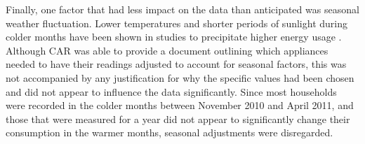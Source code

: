 Finally, one factor that had less impact on the data than anticipated was seasonal weather fluctuation. Lower temperatures and shorter periods of sunlight during colder months have been shown in studies to precipitate higher energy usage \cite{DECC}. Although CAR was able to provide a document outlining which appliances needed to have their readings adjusted to account for seasonal factors, this was not accompanied by any justification for why the specific values had been chosen and did not appear to influence the data significantly. Since most households were recorded in the colder months between November 2010 and April 2011, and those that were measured for a year did not appear to significantly change their consumption in the warmer months, seasonal adjustments were disregarded.